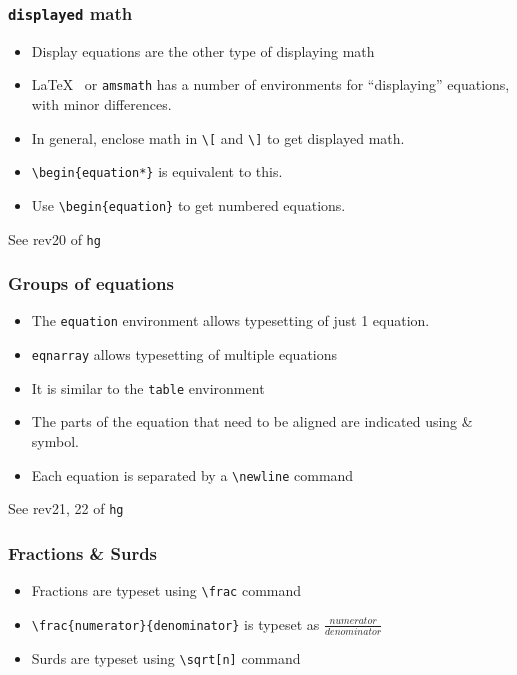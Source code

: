 \documentclass{beamer}
\newcommand{\typ}[1]{\lstinline{#1}}
\begin{document}
\begin{frame}[fragile]
  \frametitle{\lstinline+displayed+ math}
  \begin{itemize}
  \item Display equations are the other type of displaying math
  \item \LaTeX~ or \lstinline+amsmath+ has a number of environments
    for ``displaying'' equations, with minor differences. 
  \item In general, enclose math in \lstinline+\[+ and \lstinline+\]+
    to get displayed math. 
  \item \lstinline+\begin{equation*}+ is equivalent to this.
  \item Use \lstinline+\begin{equation}+ to get numbered
    equations. %
  \end{itemize}
  \tiny See rev20 of \typ{hg}    
\end{frame}

\begin{frame}[fragile]
  \frametitle{Groups of equations}
  \begin{itemize}
  \item The \lstinline+equation+ environment allows typesetting of
    just 1 equation. 
  \item \lstinline+eqnarray+ allows typesetting of multiple equations 
  \item It is similar to the \lstinline+table+ environment
  \item The parts of the equation that need to be aligned are
    indicated using \& symbol.
  \item Each equation is separated by a \lstinline+\newline+ command
  \end{itemize}
  \tiny See rev21, 22 of \typ{hg}    
\end{frame}

\begin{frame}[fragile]
  \frametitle{Fractions \& Surds}
  \begin{itemize}
  \item Fractions are typeset using \lstinline+\frac+ command 
  \item \lstinline+\frac{numerator}{denominator}+ is typeset as
    $\frac{numerator}{denominator}$
  \item Surds are typeset using \lstinline+\sqrt[n]+ command
  \end{itemize}
\end{frame}
\end{document}
